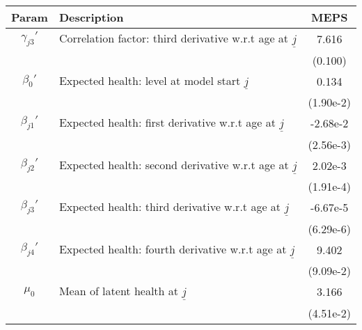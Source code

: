 \begin{table}[ht]\label{MEPSwomenHealthParams}
\footnotesize
\begin{center}
\begin{tabular}{clc}
\hline \hline
Param & Description & MEPS \\
\hline
$\gamma_{j3}'$ & Correlation factor: third derivative w.r.t age at $\underline{j}$ & 7.616 \\
 & & (0.100) \\
$\beta_{0}'$ & Expected health: level at model start $\underline{j}$ & 0.134 \\
 & & (1.90e-2) \\
$\beta_{j1}'$ & Expected health: first derivative w.r.t age at $\underline{j}$ & -2.68e-2 \\
 & & (2.56e-3) \\
$\beta_{j2}'$ & Expected health: second derivative w.r.t age at $\underline{j}$ & 2.02e-3 \\
 & & (1.91e-4) \\
$\beta_{j3}'$ & Expected health: third derivative w.r.t age at $\underline{j}$ & -6.67e-5 \\
 & & (6.29e-6) \\
$\beta_{j4}'$ & Expected health: fourth derivative w.r.t age at $\underline{j}$ & 9.402 \\
 & & (9.09e-2) \\
$\mu_0$ & Mean of latent health at $\underline{j}$ & 3.166 \\
 & & (4.51e-2) \\
\hline\hline
\end{tabular}
\end{center}
\end{table}
